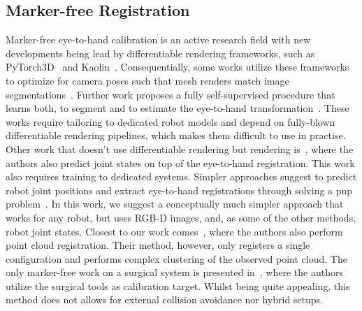 \subsection{Marker-free Registration}
Marker-free eye-to-hand calibration is an active research field with new developments being lead by differentiable rendering frameworks, such as PyTorch3D~\cite{ravi2020pytorch3d} and Kaolin~\cite{KaolinLibrary}. Consequentially, some works utilize these frameworks to optimize for camera poses such that mesh renders match image segmentations~\cite{Chen:RAL:2023}. Further work proposes a fully self-supervised procedure that learns both, to segment and to estimate the eye-to-hand transformation~\cite{lu2023markerless}. These works require tailoring to dedicated robot models and depend on fully-blown differentiable rendering pipelines, which makes them difficult to use in practise. Other work that doesn't use differentiable rendering but rendering is~\cite{labbe2021single}, where the authors also predict joint states on top of the eye-to-hand registration. This work also requires training to dedicated systems. Simpler approaches suggest to predict robot joint positions and extract eye-to-hand registrations through solving a \gls{pnp} problem~\cite{lee2020camera}. In this work, we suggest a conceptually much simpler approach that works for any robot, but uses RGB-D images, and, as some of the other methods, robot joint states. Closest to our work comes~\cite{point_cloud_based_robot_cell_calib}, where the authors also perform point cloud registration. Their method, however, only registers a single configuration and performs complex clustering of the observed point cloud. The only marker-free work on a surgical system is presented in~\cite{hand_eye_calibration_robotic_assisted}, where the authors utilize the surgical tools as calibration target. Whilst being quite appealing, this method does not allows for external collision avoidance nor hybrid setups.



